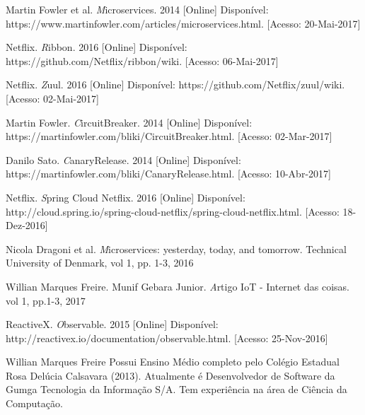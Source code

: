 \documentclass[journal]{IEEEtran}
\begin{document}
\begin{thebibliography}{1}
Martin Fowler et al. \emph Microservices. 2014 [Online] Disponível: https://www.martinfowler.com/articles/microservices.html. [Acesso: 20-Mai-2017]

Netflix. \emph Ribbon. 2016 [Online] Disponível: https://github.com/Netflix/ribbon/wiki. [Acesso: 06-Mai-2017]

Netflix. \emph Zuul. 2016 [Online] Disponível: https://github.com/Netflix/zuul/wiki. [Acesso: 02-Mai-2017]

Martin Fowler. \emph CircuitBreaker. 2014 [Online] Disponível: https://martinfowler.com/bliki/CircuitBreaker.html. [Acesso: 02-Mar-2017]

Danilo Sato. \emph CanaryRelease. 2014 [Online] Disponível: https://martinfowler.com/bliki/CanaryRelease.html. [Acesso: 10-Abr-2017]

Netflix. \emph Spring Cloud Netflix. 2016 [Online] Disponível: http://cloud.spring.io/spring-cloud-netflix/spring-cloud-netflix.html. [Acesso: 18-Dez-2016]

Nicola Dragoni et al. \emph Microservices: yesterday, today, and tomorrow. Technical University of Denmark, vol 1, pp. 1-3, 2016

Willian Marques Freire. Munif Gebara Junior. \emph Artigo IoT - Internet das coisas. vol 1, pp.1-3, 2017

ReactiveX. \emph Observable. 2015 [Online] Disponível: http://reactivex.io/documentation/observable.html. [Acesso: 25-Nov-2016]

\end{thebibliography}


\begin{IEEEbiography}{Willian Marques Freire}
Possui Ensino Médio completo pelo Colégio Estadual Rosa Delúcia Calsavara (2013). Atualmente é Desenvolvedor de Software da Gumga Tecnologia da Informação S/A. Tem experiência na área de Ciência da Computação.
\end{IEEEbiography}
\end{document}
